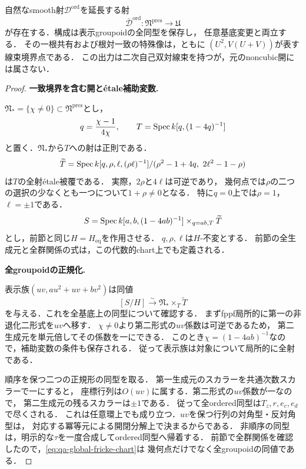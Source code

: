 \begin{theorem}[自然な順序付きFricke射の大域的境界延長]
\label{thm:qa-global-fricke-balanced-extension}
自然なsmooth射$\mathscr D^{\mathrm{ord}}$を延長する射
\[
 \overline{\mathscr D}^{\mathrm{ord}}:\mathfrak N^{\mathrm{pres}}
       \longrightarrow\mathfrak U
\]
が存在する．構成は表示groupoidの全同型を保存し，
任意基底変更と両立する．
その一根共有および根対一致の特殊像は，ともに
$(U^2,V(U+V))$が表す線束境界点である．
この出力は二次自己双対線束を持つが，元のnoncubic開には属さない．
\end{theorem}
\begin{proof}
\par\medskip\noindent\textbf{一致境界を含む開と\'etale補助変数.}\par\nobreak\smallskip
$\mathfrak N_*=\{\chi\ne0\}\subset\mathfrak N^{\mathrm{pres}}$とし，
\[
 q=\frac{\chi-1}{4\chi},\qquad
 T=\operatorname{Spec} k[q,(1-4q)^{-1}]
\]
と置く．$\mathfrak N_*$から$T$への射は正則である．
\[
 \widetilde T=
 \operatorname{Spec} k[q,\rho,\ell,(\rho\ell)^{-1}]/
 (\rho^2-1+4q,\ 2\ell^2-1-\rho)
\]
は$T$の全射\'etale被覆である．
実際，$2\rho$と$4\ell$は可逆であり，
幾何点では$\rho$の二つの選択の少なくとも一つについて$1+\rho\ne0$となる．
特に$q=0$上では$\rho=1$，$\ell=\pm1$である．
\[
 S=\operatorname{Spec} k[a,b,(1-4ab)^{-1}]\times_{q=ab,T}\widetilde T
\]
とし，前節と同じ$H=H_{\mathrm{eq}}$を作用させる．
$q,\rho,\ell$は$H$-不変とする．
前節の全生成元と全群関係の式は，この代数的chart上でも定義される．

\par\medskip\noindent\textbf{全groupoidの正規化.}\par\nobreak\smallskip
表示族$(uv,au^2+uv+bv^2)$は同値
\[
 [S/H]\xrightarrow{\sim}
 \mathfrak N_*\times_T\widetilde T
 \tag{F-chart}\label{eq:qa-global-fricke-chart}
\]
を与える．これを全基底上の同型について確認する．
まずfppf局所的に第一の非退化二形式を$uv$へ移す．
$\chi\ne0$より第二形式の$uv$係数は可逆であるため，
第二生成元を単元倍してその係数を一にできる．
このとき$\chi=(1-4ab)^{-1}$なので，補助変数の条件も保存される．
従って表示族は対象について局所的に全射である．

順序を保つ二つの正規形の同型を取る．
第一生成元のスカラーを共通次数スカラーで一にすると，
座標行列は$O(uv)$に属する．第二形式の$uv$係数が一なので，
第二生成元の残るスカラーは$\pm1$である．
従って全ordered同型は$T_z,r,e_c,e_d$で尽くされる．
これは任意環上でも成り立つ．$uv$を保つ行列の対角型・反対角型は，
対応する冪等元による開閉分解上で決まるからである．
非順序の同型は，明示的な$\tau$を一度合成してordered同型へ帰着する．
前節で全群関係を確認したので，\eqref{eq:qa-global-fricke-chart}は
幾何点だけでなく全groupoidの同値である．


\end{proof}
